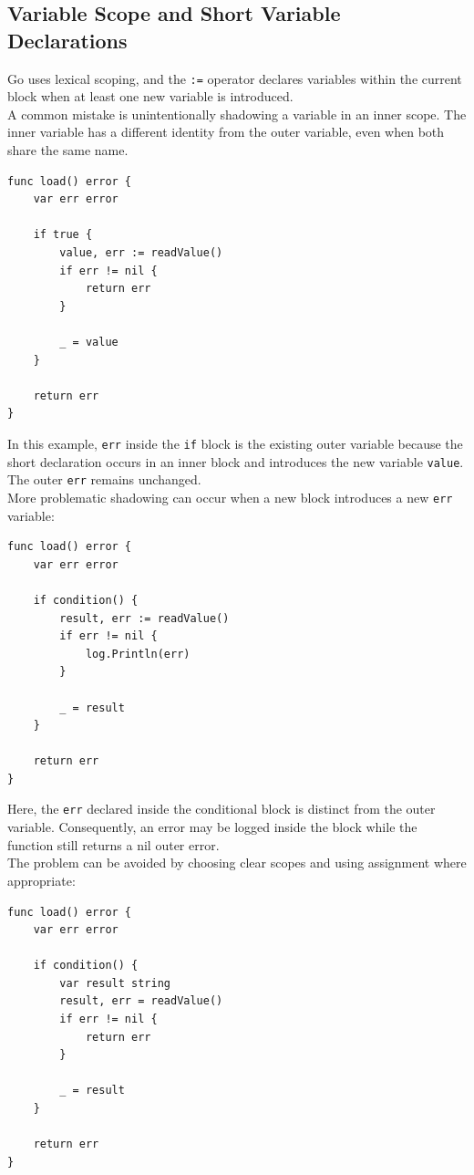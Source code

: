 \subsection{Variable Scope and Short Variable Declarations}

Go uses lexical scoping, and the \texttt{:=} operator declares variables within the current block when at least one new variable is introduced.\\

A common mistake is unintentionally shadowing a variable in an inner scope. The inner variable has a different identity from the outer variable, even when both share the same name.

\begin{lstlisting}
func load() error {
    var err error

    if true {
        value, err := readValue()
        if err != nil {
            return err
        }

        _ = value
    }

    return err
}
\end{lstlisting}

In this example, \texttt{err} inside the \texttt{if} block is the existing outer variable because the short declaration occurs in an inner block and introduces the new variable \texttt{value}. The outer \texttt{err} remains unchanged.\\

More problematic shadowing can occur when a new block introduces a new \texttt{err} variable:

\begin{lstlisting}
func load() error {
    var err error

    if condition() {
        result, err := readValue()
        if err != nil {
            log.Println(err)
        }

        _ = result
    }

    return err
}
\end{lstlisting}

Here, the \texttt{err} declared inside the conditional block is distinct from the outer variable. Consequently, an error may be logged inside the block while the function still returns a nil outer error.\\

The problem can be avoided by choosing clear scopes and using assignment where appropriate:

\begin{lstlisting}
func load() error {
    var err error

    if condition() {
        var result string
        result, err = readValue()
        if err != nil {
            return err
        }

        _ = result
    }

    return err
}
\end{lstlisting}

